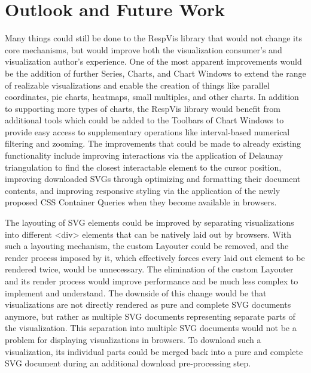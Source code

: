 \chapter{Outlook and Future Work}
\label{chap:Outlook}

Many things could still be done to the RespVis library that would not
change its core mechanisms, but would improve both the visualization
consumer's and visualization author's experience. One of the most
apparent improvements would be the addition of further Series, Charts,
and Chart Windows to extend the range of realizable visualizations and
enable the creation of things like parallel coordinates, pie charts,
heatmaps, small multiples, and other charts. In addition to supporting
more types of charts, the RespVis library would benefit from
additional tools which could be added to the Toolbars of Chart Windows
to provide easy access to supplementary operations like interval-based
numerical filtering and zooming. The improvements that could be made
to already existing functionality include improving interactions via
the application of Delaunay triangulation
\parencite{Delaunay,DelaunayAlgorithms} to find the closest
interactable element to the cursor position, improving downloaded SVGs
through optimizing and formatting their document contents, and
improving responsive styling via the application of the newly proposed
CSS Container Queries \parencite{CSSContainment3} when they become
available in browsers.

The layouting of SVG elements could be improved by separating
visualizations into different <div> elements that can be natively laid
out by browsers. With such a layouting mechanism, the custom Layouter
could be removed, and the render process imposed by it, which
effectively forces every laid out element to be rendered twice, would
be unnecessary. The elimination of the custom Layouter and its render
process would improve performance and be much less complex to
implement and understand. The downside of this change would be that
visualizations are not directly rendered as pure and complete SVG
documents anymore, but rather as multiple SVG documents representing
separate parts of the visualization. This separation into multiple SVG
documents would not be a problem for displaying visualizations in
browsers. To download such a visualization, its individual parts could
be merged back into a pure and complete SVG document during an
additional download pre-processing step.

